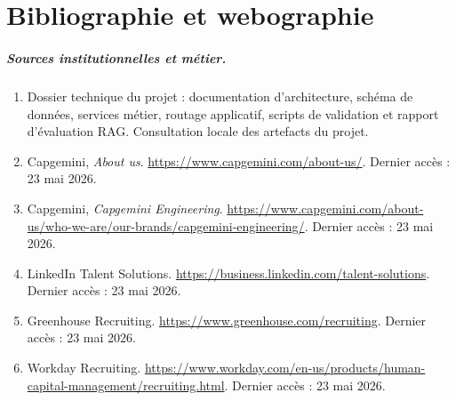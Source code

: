 \chapter*{Bibliographie et webographie}
{}

\begingroup
\sloppy

\paragraph{Sources institutionnelles et métier.}
\begin{enumerate}
  \item\label{web:project-docs} Dossier technique du projet \projectname{} : documentation d'architecture, schéma de données, services métier, routage applicatif, scripts de validation et rapport d'évaluation RAG. Consultation locale des artefacts du projet.
  \item\label{web:capgemini-about} Capgemini, \textit{About us}. \url{https://www.capgemini.com/about-us/}. Dernier accès : 23 mai 2026.
  \item\label{web:capgemini-engineering} Capgemini, \textit{Capgemini Engineering}. \url{https://www.capgemini.com/about-us/who-we-are/our-brands/capgemini-engineering/}. Dernier accès : 23 mai 2026.
  \item\label{web:linkedin-talent} LinkedIn Talent Solutions. \url{https://business.linkedin.com/talent-solutions}. Dernier accès : 23 mai 2026.
  \item\label{web:greenhouse-recruiting} Greenhouse Recruiting. \url{https://www.greenhouse.com/recruiting}. Dernier accès : 23 mai 2026.
  \item\label{web:workday-recruiting} Workday Recruiting. \url{https://www.workday.com/en-us/products/human-capital-management/recruiting.html}. Dernier accès : 23 mai 2026.
\end{enumerate}

